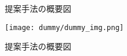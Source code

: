 \begin{figure}[htb]
    \centering
    
    \caption{提案手法の概要図}
    \label{fig:proposed_method}
\end{figure}


\begin{figure}[htb]
    \centering
    \texttt{[image: dummy/dummy\_img.png]}
    \caption{提案手法の概要図}
    \label{fig:proposed_method}
\end{figure}
